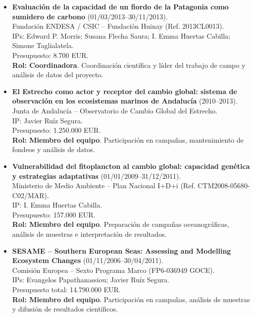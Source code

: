 \documentclass[11pt,a4paper]{article}
\begin{document}
\begin{itemize}[leftmargin=*]
    \item \textbf{Evaluación de la capacidad de un fiordo de la Patagonia como sumidero de carbono} (01/03/2013--30/11/2013).\\
    Fundación ENDESA / CSIC – Fundación Huinay (Ref. 2013CL0013).\\
    IPs: Edward P. Morris; Susana Flecha Saura; I. Emma Huertas Cabilla; Simone Taglialatela.\\
    Presupuesto: 8.700 EUR.\\
    \textbf{Rol: Coordinadora}. Coordinación científica y líder del trabajo de campo y análisis de datos del proyecto.

    \item \textbf{El Estrecho como actor y receptor del cambio global: sistema de observación en los ecosistemas marinos de Andalucía} (2010--2013).\\
    Junta de Andalucía – Observatorio de Cambio Global del Estrecho.\\
    IP: Javier Ruíz Segura.\\
    Presupuesto: 1.250.000 EUR.\\
    \textbf{Rol: Miembro del equipo}. Participación en campañas, mantenimiento de fondeos y análisis de datos.

    \item \textbf{Vulnerabilidad del fitoplancton al cambio global: capacidad genética y estrategias adaptativas} (01/01/2009--31/12/2011).\\
    Ministerio de Medio Ambiente – Plan Nacional I+D+i (Ref. CTM2008-05680-C02/MAR).\\
    IP: I. Emma Huertas Cabilla.\\
    Presupuesto: 157.000 EUR.\\
    \textbf{Rol: Miembro del equipo}. Preparación de campañas oceanográficas, análisis de muestras e interpretación de resultados.

    \item \textbf{SESAME – Southern European Seas: Assessing and Modelling Ecosystem Changes} (01/11/2006--30/04/2011).\\
    Comisión Europea – Sexto Programa Marco (FP6-036949 GOCE).\\
    IPs: Evangelos Papathanassiou; Javier Ruíz Segura.\\
    Presupuesto total: 14.790.000 EUR.\\
    \textbf{Rol: Miembro del equipo}. Participación en campañas, análisis de muestras y difusión de resultados científicos.


\end{itemize}
\end{document}
